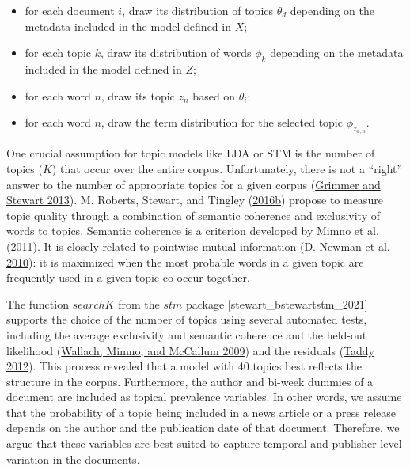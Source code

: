 \documentclass[
  12pt,
]{article}
\providecommand{\tightlist}{%
  \setlength{\itemsep}{0pt}\setlength{\parskip}{0pt}}
\begin{document}
\begin{itemize}
\tightlist
\item
  for each document \(i\), draw its distribution of topics \(\theta_d\)
  depending on the metadata included in the model defined in \(X\);
\item
  for each topic \(k\), draw its distribution of words \(\phi_k\)
  depending on the metadata included in the model defined in \(Z\);
\item
  for each word \(n\), draw its topic \(z_n\) based on \(\theta_i\);
\item
  for each word \(n\), draw the term distribution for the selected topic
  \(\phi_{z_{d,n}}\).
\end{itemize}

One crucial assumption for topic models like LDA or STM is the number of
topics (\(K\)) that occur over the entire corpus. Unfortunately, there
is not a ``right'' answer to the number of appropriate topics for a
given corpus (\protect\hyperlink{ref-grimmer_text_2013}{Grimmer and
Stewart 2013}). M. Roberts, Stewart, and Tingley
(\protect\hyperlink{ref-roberts_stm_2016}{2016b}) propose to measure
topic quality through a combination of semantic coherence and
exclusivity of words to topics. Semantic coherence is a criterion
developed by Mimno et al.
(\protect\hyperlink{ref-mimno_optimizing_2011}{2011}). It is closely
related to pointwise mutual information
(\protect\hyperlink{ref-newman_automatic_2010}{D. Newman et al. 2010}):
it is maximized when the most probable words in a given topic are
frequently used in a given topic co-occur together.

The function \(searchK\) from the \(stm\) package
{[}stewart\_bstewartstm\_2021{]} supports the choice of the number of
topics using several automated tests, including the average exclusivity
and semantic coherence and the held-out likelihood
(\protect\hyperlink{ref-wallach_rethinking_2009}{Wallach, Mimno, and
McCallum 2009}) and the residuals
(\protect\hyperlink{ref-taddy_estimation_2012}{Taddy 2012}). This
process revealed that a model with 40 topics best reflects the structure
in the corpus. Furthermore, the author and bi-week dummies of a document
are included as topical prevalence variables. In other words, we assume
that the probability of a topic being included in a news article or a
press release depends on the author and the publication date of that
document. Therefore, we argue that these variables are best suited to
capture temporal and publisher level variation in the documents.
\end{document}
